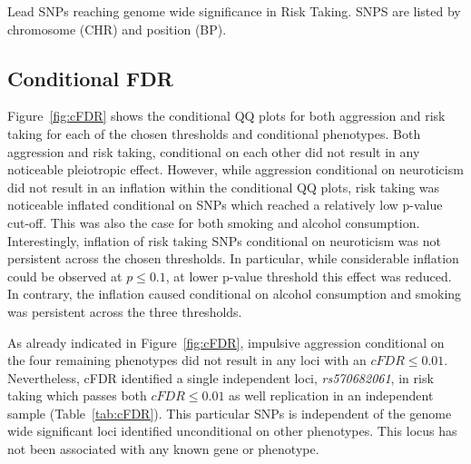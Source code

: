 \begin{table}
	\small
	\centering
	
  \caption{
    Lead SNPs reaching genome wide significance in Risk Taking.
    SNPS are listed by chromosome (CHR) and position (BP).
  }\label{tab:lead_snps_risk}
\end{table}

\subsection{Conditional FDR}
\label{sub:conditional_fdr}

Figure~\ref{fig:cFDR} shows the conditional QQ plots for both aggression and risk taking for each of the chosen thresholds and conditional phenotypes.
Both aggression and risk taking, conditional on each other did not result in any noticeable pleiotropic effect.
However, while aggression conditional on neuroticism did not result in an inflation within the conditional QQ plots, risk taking was noticeable inflated conditional on SNPs which reached a relatively low p-value cut-off.
This was also the case for both smoking and alcohol consumption.
Interestingly, inflation of risk taking SNPs conditional on neuroticism was not persistent across the chosen thresholds.
In particular, while considerable inflation could be observed at $p\leq0.1$, at lower p-value threshold this effect was reduced.
In contrary, the inflation caused conditional on alcohol consumption and smoking was persistent across the three thresholds.

As already indicated in Figure~\ref{fig:cFDR}, impulsive aggression conditional on the four remaining phenotypes did not result in any loci with an $cFDR\leq0.01$.
Nevertheless, cFDR identified a single independent loci, \textit{rs570682061}, in risk taking which passes both $cFDR\leq0.01$ as well replication in an independent sample (Table~\ref{tab:cFDR}).
This particular SNPs is independent of the genome wide significant loci identified unconditional on other phenotypes.
This locus has not been associated with any known gene or phenotype.

